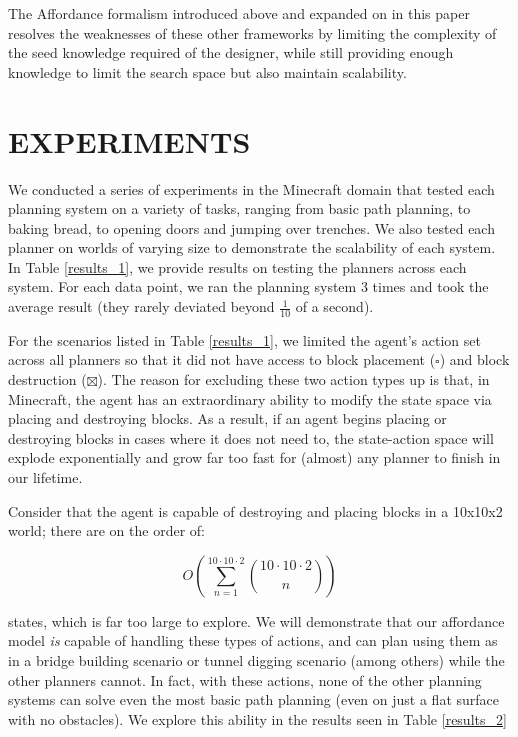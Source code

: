 \documentclass[]{article}
\begin{document}
The Affordance formalism introduced above and expanded on in this 
paper resolves the weaknesses of these other frameworks by limiting 
the complexity of the seed knowledge required of the designer, while 
still providing enough knowledge to limit the search space but also 
maintain scalability.

\section{EXPERIMENTS}

We conducted a series of experiments in the Minecraft domain that tested 
each planning system on a variety of tasks, ranging from basic path planning,
 to baking bread, to opening doors and jumping over trenches.  We also tested 
 each planner on worlds of varying size to demonstrate the scalability of each 
 system. In Table \ref{results_1}, we provide results on testing the planners 
 across each system. For each data point, we ran the planning system 3 times 
 and took the average result (they rarely deviated beyond $\frac{1}{10}$ of a second).

For the scenarios listed in Table \ref{results_1}, we limited the agent's 
action set across all planners so that it did not have access to block 
placement ($\square$) and block destruction ($\boxtimes$). The reason 
for excluding these two action types up is that, in Minecraft, the agent 
has an extraordinary ability to modify the state space via placing and 
destroying blocks. As a result, if an agent begins placing or destroying 
blocks in cases where it does not need to, the state-action space will 
explode exponentially and grow far too fast for (almost) any planner to 
finish in our lifetime. 

Consider that the agent is capable of destroying and placing blocks 
in a 10x10x2 world; there are on the order of:

\begin{equation}
O\left(\sum_{n=1}^{10 \cdot 10 \cdot 2} \binom{10 \cdot 10 \cdot 2}{n}\right)
\label{eq:mc_explode}
\end{equation}

states, which is far too large to explore. We will demonstrate that our 
affordance model {\it is} capable of handling these types of actions, 
and can plan using them as in a bridge building scenario or tunnel 
digging scenario (among others) while the other planners cannot. 
In fact, with these actions, none of the other planning systems 
can solve even the most basic path planning (even on just a flat 
surface with no obstacles). We explore this ability in the results 
seen in Table \ref{results_2}
\end{document}
